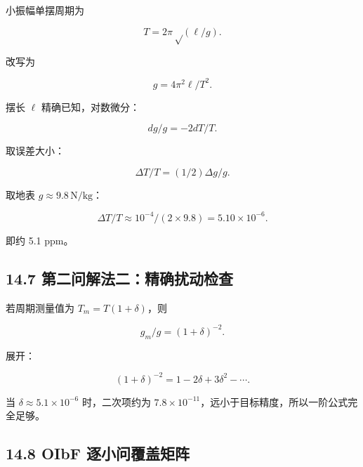 \documentclass[
  11pt,
  UTF8]{ctexart}
\begin{document}
小振幅单摆周期为

\[T=2π√(\ell/g).\]

改写为

\[g=4π^2\ell/T^2.\]

摆长 \(\ell\) 精确已知，对数微分：

\[dg/g=-2dT/T.\]

取误差大小：

\[ΔT/T=(1/2)Δg/g.\]

取地表 \(g≈9.8\,\mathrm{N/kg}\)：

\[ΔT/T≈10^{-4}/(2×9.8)=5.10×10^{-6}.\]

即约 5.1 ppm。

\hypertarget{ux7b2cux4e8cux95eeux89e3ux6cd5ux4e8cux7cbeux786eux6270ux52a8ux68c0ux67e5}{%
\subsection{14.7
第二问解法二：精确扰动检查}\label{ux7b2cux4e8cux95eeux89e3ux6cd5ux4e8cux7cbeux786eux6270ux52a8ux68c0ux67e5}}

若周期测量值为 \(T_m=T(1+δ)\)，则

\[g_m/g=(1+δ)^{-2}.\]

展开：

\[(1+δ)^{-2}=1-2δ+3δ^2-\cdots.\]

当 \(δ≈5.1×10^{-6}\) 时，二次项约为
\(7.8×10^{-11}\)，远小于目标精度，所以一阶公式完全足够。

\hypertarget{oibf-ux9010ux5c0fux95eeux8986ux76d6ux77e9ux9635}{%
\subsection{14.8 OIbF
逐小问覆盖矩阵}\label{oibf-ux9010ux5c0fux95eeux8986ux76d6ux77e9ux9635}}
\end{document}
